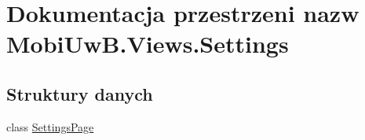 \hypertarget{a00278}{}\section{Dokumentacja przestrzeni nazw Mobi\+Uw\+B.\+Views.\+Settings}
\label{a00278}
\subsection*{Struktury danych}
\begin{DoxyCompactItemize}
\item 
class \hyperlink{a00056}{Settings\+Page}
\end{DoxyCompactItemize}
